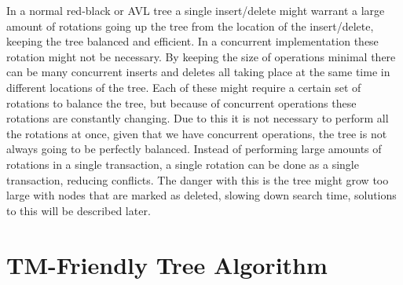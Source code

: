 \documentclass[10pt]{sigplanconf}
\begin{document}
In a normal red-black or AVL tree a single insert/delete might warrant a large amount of rotations going up the tree from the location of the insert/delete,
keeping the tree balanced and efficient.
In a concurrent implementation these rotation might not be necessary.
By keeping the size of operations minimal there can be many concurrent inserts and deletes all taking place at the same time in different locations of the tree.
Each of these might require a certain set of rotations to balance the tree, but because of concurrent operations these rotations are constantly changing.
Due to this it is not necessary to perform all the rotations at once, given that we have concurrent operations, the tree is not always going to be perfectly balanced.
Instead of performing large amounts of rotations in a single transaction, a single rotation can be done as a single transaction, reducing conflicts.
The danger with this is the tree might grow too large with nodes that are marked as deleted, slowing down search time, solutions to this will be
described later.


\section{TM-Friendly Tree Algorithm}
%
%   	
%   	
%		
%		
%		
%		
\end{document}

